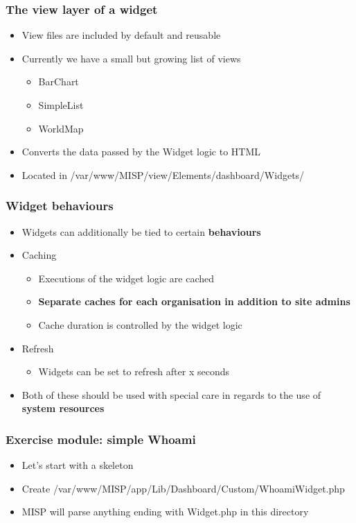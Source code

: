\begin{frame}
  \frametitle{The view layer of a widget}
  \begin{itemize}
        \item View files are included by default and reusable
        \item Currently we have a small but growing list of views
        \begin{itemize}
            \item BarChart
            \item SimpleList
            \item WorldMap
        \end{itemize}
        \item Converts the data passed by the Widget logic to HTML
        \item Located in /var/www/MISP/view/Elements/dashboard/Widgets/
  \end{itemize}
\end{frame}

\begin{frame}
  \frametitle{Widget behaviours}
  \begin{itemize}
    \item Widgets can additionally be tied to certain {\bf behaviours}
    \item Caching
    \begin{itemize}
      \item Executions of the widget logic are cached
      \item {\bf Separate caches for each organisation in addition to site admins}
      \item Cache duration is controlled by the widget logic
    \end{itemize}
    \item Refresh
    \begin{itemize}
      \item Widgets can be set to refresh after x seconds
    \end{itemize}
    \item Both of these should be used with special care in regards to the use of {\bf system resources}
  \end{itemize}
\end{frame}

\begin{frame}
    \frametitle{Exercise module: simple Whoami}
    \begin{itemize}
        \item Let's start with a skeleton
        \item Create /var/www/MISP/app/Lib/Dashboard/Custom/WhoamiWidget.php
        \item MISP will parse anything ending with Widget.php in this directory
    \end{itemize}
\end{frame}

